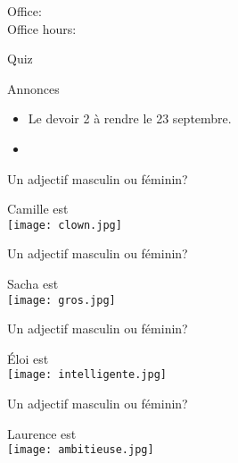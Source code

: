 \documentclass{beamer}
\subtitle[Femmes et questions]{Les femmes et les questions}
\begin{document}
  \begin{frame}
    \titlepage
    \tiny{Office: \\
          Office hours: }
  \end{frame}

  \begin{frame}{}
    \begin{center}
      \Large Quiz
    \end{center}
  \end{frame}

  \begin{frame}{Annonces}
    \begin{itemize}
      \item Le devoir 2 à rendre le 23 septembre.
      \item[] 
    \end{itemize}
  \end{frame}

  \begin{frame}{Un adjectif masculin ou féminin?}
    \begin{center}
      Camille est \underline{} \\
      \texttt{[image: clown.jpg]}
    \end{center}
  \end{frame}

  \begin{frame}{Un adjectif masculin ou féminin?}
    \begin{center}
      Sacha est \underline{} \\
      \texttt{[image: gros.jpg]}
    \end{center}
  \end{frame}

  \begin{frame}{Un adjectif masculin ou féminin?}
    \begin{center}
      Éloi est \underline{} \\
      \texttt{[image: intelligente.jpg]}
    \end{center}
  \end{frame}

  \begin{frame}{Un adjectif masculin ou féminin?}
    \begin{center}
      Laurence est \underline{} \\
      \texttt{[image: ambitieuse.jpg]}
    \end{center}
  \end{frame}
\end{document}
